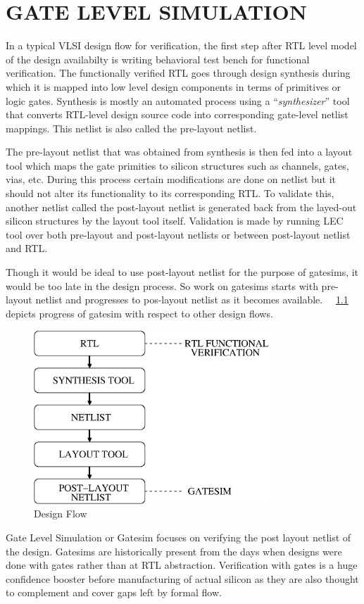 \chapter{GATE LEVEL SIMULATION}
\label{chap:gate_intro.tex}

In a typical VLSI design flow for verification, the first step after RTL level model of the design availabilty is writing behavioral test bench for functional verification. The functionally verified RTL goes through design synthesis during which it is mapped into low level design components in terms of primitives or logic gates. Synthesis is mostly an automated process using a ``{\it synthesizer}'' tool that converts RTL-level design source code into corresponding gate-level netlist mappings. This netlist is also called the pre-layout netlist.

The pre-layout netlist that was obtained from synthesis is then fed into a layout tool which maps the gate primities to silicon structures such as channels, gates, vias, etc. During this process certain modifications are done on netlist but it should not alter its functionality to its corresponding RTL. To validate this, another netlist called the post-layout netlist is generated back from the layed-out silicon structures by the layout tool itself. Validation is made by running LEC tool over both pre-layout and post-layout netlists or between post-layout netlist and RTL.

Though it would be ideal to use post-layout netlist for the purpose of gatesims, it would be too late in the design process. So work on gatesims starts with pre-layout netlist and progresses to pos-layout netlist as it becomes available. ~\figurename{~\ref{fig:gatesim.eps}} depicts progress of gatesim with respect to other design flows.

\begin{figure}[H]
\centering
\includegraphics[width=3.5in]{./figures/gatesim.eps}
\caption{Design Flow}
\label{fig:gatesim.eps}
\end{figure}
Gate Level Simulation or Gatesim focuses on verifying the post layout netlist of the design. Gatesims are historically present from the days when designs were done with gates rather than at RTL abstraction. Verification with gates is a huge confidence booster before manufacturing of actual silicon as they are also thought to complement and cover gaps left by formal flow.


